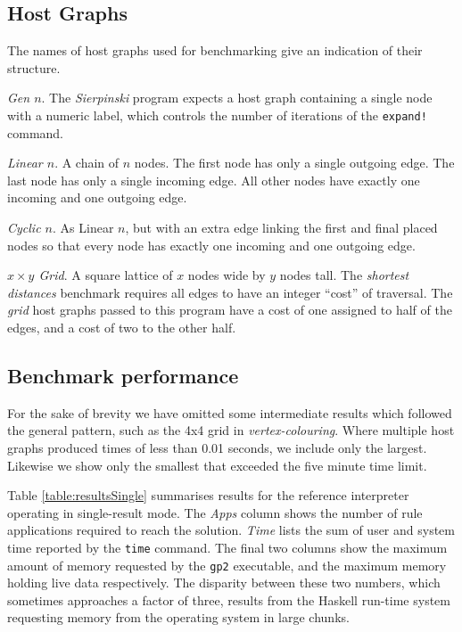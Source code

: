 \subsection{Host Graphs}
\label{subsec:hosts}

The names of host graphs used for benchmarking give an indication of their structure.

\vspace{.5\baselineskip}
\noindent
\emph{Gen $n$}. The \textit{Sierpinski} program expects a host graph containing a single node with a numeric label, which controls the number of iterations of the \texttt{expand!} command.

\vspace{.5\baselineskip}
\noindent
\emph{Linear $n$}. A chain of $n$ nodes. The first node has only a single outgoing edge. The last node has only a single incoming edge. All other nodes have exactly one incoming and one outgoing edge.

\vspace{.5\baselineskip}
\noindent
\emph{Cyclic $n$}. As Linear $n$, but with an extra edge linking the first and final placed nodes so that every node has exactly one incoming and one outgoing edge.

\vspace{.5\baselineskip}
\noindent
\emph{$x \times y$ Grid}. A square lattice of $x$ nodes wide by $y$ nodes tall. The \textit{shortest distances} benchmark requires all edges to have an integer ``cost'' of traversal. The \textit{grid} host graphs passed to this program have a cost of one assigned to half of the edges, and a cost of two to the other half.



\subsection{Benchmark performance}\label{sec:benchperf}

For the sake of brevity we have omitted some intermediate results which followed the general pattern, such as the 4x4 grid in \textit{vertex-colouring}. Where multiple host graphs produced times of less than 0.01 seconds, we include only the largest. Likewise we show only the smallest that exceeded the five minute time limit.



Table \ref{table:resultsSingle} summarises results for the reference interpreter operating in single-result mode. The \textit{Apps} column shows the number of rule applications required to reach the solution. \textit{Time} lists the sum of user and system time reported by the \texttt{time} command. The final two columns show the maximum amount of memory requested by the \texttt{gp2} executable, and the maximum memory holding live data respectively. The disparity between these two numbers, which sometimes approaches a factor of three, results from the Haskell run-time system requesting memory from the operating system in large chunks.

